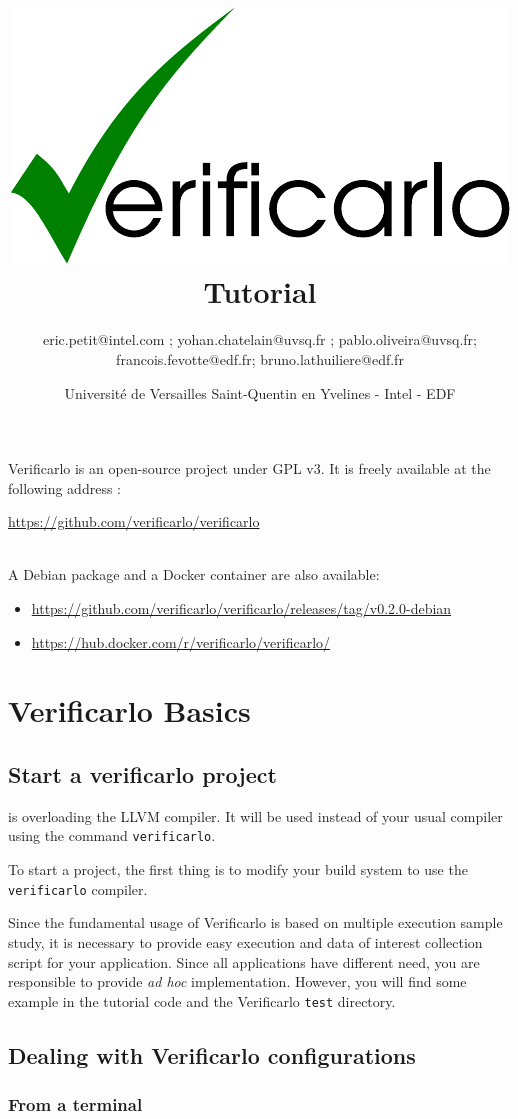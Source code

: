 \documentclass{TP}
\title{\includegraphics[keepaspectratio, scale=0.4]{verificarlo-logo.pdf}\\[4mm]
  Tutorial}
\author{eric.petit@intel.com ; yohan.chatelain@uvsq.fr ; pablo.oliveira@uvsq.fr;
  francois.fevotte@edf.fr; bruno.lathuiliere@edf.fr}
\date{Université de Versailles Saint-Quentin en Yvelines - Intel - EDF}
\begin{document}
\maketitle
Verificarlo is an open-source project under GPL v3. It is freely available at the following address : \\
\centerline{\url{https://github.com/verificarlo/verificarlo}}

~\\A Debian package and a Docker container are also available: \\
\begin{itemize}
\item \url{https://github.com/verificarlo/verificarlo/releases/tag/v0.2.0-debian}
\item \url{https://hub.docker.com/r/verificarlo/verificarlo/}
\end{itemize}

\section{Verificarlo Basics}
\subsection{Start a verificarlo project}

{} is overloading the LLVM compiler. It will be used instead of your usual compiler using the command {\tt verificarlo}.

To start a project, the first thing is to modify your build system to use the {\tt{verificarlo}} compiler.

Since the fundamental usage of Verificarlo is based on multiple execution sample study, it is necessary to provide easy execution and data of interest collection script for your application. Since all applications have different need, you are responsible to provide {\it ad hoc} implementation. However, you will find some example in the tutorial code and the Verificarlo {\tt test} directory.

\subsection{Dealing with Verificarlo configurations}

\subsubsection{From a terminal}
\end{document}
